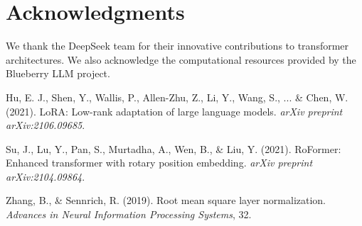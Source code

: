 \documentclass[11pt,a4paper]{article}
\begin{document}
\section*{Acknowledgments}

We thank the DeepSeek team for their innovative contributions to transformer architectures. We also acknowledge the computational resources provided by the Blueberry LLM project.

\begin{thebibliography}{9}

Hu, E. J., Shen, Y., Wallis, P., Allen-Zhu, Z., Li, Y., Wang, S., ... \& Chen, W. (2021).
\newblock LoRA: Low-rank adaptation of large language models.
\newblock \textit{arXiv preprint arXiv:2106.09685}.

Su, J., Lu, Y., Pan, S., Murtadha, A., Wen, B., \& Liu, Y. (2021).
\newblock RoFormer: Enhanced transformer with rotary position embedding.
\newblock \textit{arXiv preprint arXiv:2104.09864}.

Zhang, B., \& Sennrich, R. (2019).
\newblock Root mean square layer normalization.
\newblock \textit{Advances in Neural Information Processing Systems}, 32.

\end{thebibliography}
\end{document}
